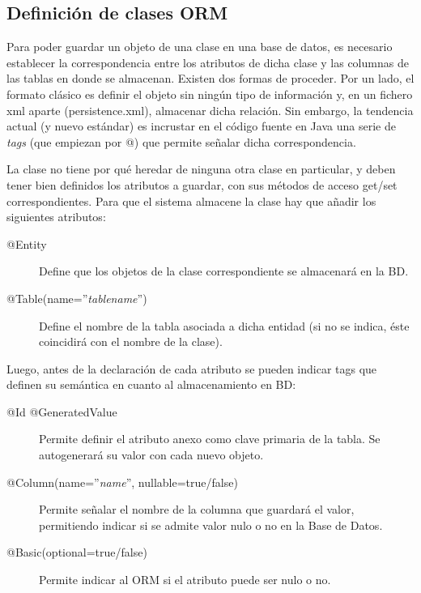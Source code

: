 \documentclass[11pt]{article}
\begin{document}
\subsection{Definición de clases ORM} \label{sec-6-2}

Para poder guardar un objeto de una clase en una base de datos, es necesario establecer la
correspondencia entre los atributos de dicha clase y las columnas de las tablas
en donde se almacenan. Existen dos formas de proceder. Por un lado, el formato
clásico es definir el objeto sin ningún tipo de información y, en un fichero xml
aparte (persistence.xml), almacenar dicha relación. Sin embargo, la tendencia
actual (y nuevo estándar) es incrustar en el código fuente en Java una serie de \emph{tags} (que empiezan por @) que permite señalar dicha correspondencia.

La clase no tiene por qué heredar de ninguna otra clase en particular, y deben tener bien definidos los
atributos a guardar, con sus métodos de acceso get/set correspondientes. Para que el sistema almacene la clase hay que añadir los siguientes atributos:


\begin{description}

\item[@Entity] Define que los objetos de la clase correspondiente se almacenará en la BD. 

\item[@Table(name=''\emph{tablename}'')] Define el nombre de la tabla asociada a dicha entidad (si no se indica, éste coincidirá con el nombre de la clase).

\end{description}


Luego, antes de la declaración de cada atributo se pueden indicar tags que definen su semántica en cuanto al almacenamiento en BD:

\begin{description}

\item[@Id @GeneratedValue] Permite definir el atributo anexo como clave primaria de la tabla. Se autogenerará su valor con cada nuevo objeto.

\item[@Column(name=''\emph{name}'', nullable=true/false)] Permite señalar el nombre de la columna que guardará  el valor, permitiendo indicar si se admite valor nulo o no en la Base de Datos. 

\item[@Basic(optional=true/false)] Permite indicar al ORM si el atributo puede ser nulo o no.


\end{description}
\end{document}
